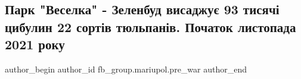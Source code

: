  
 
 
 
 

\subsection{Парк "Веселка" - Зеленбуд висаджує 93 тисячі цибулин 22 сортів тюльпанів. Початок листопада 2021 року}
\label{sec:19_02_2023.fb.fb_group.mariupol.pre_war.1.park__veselka____zel}

\ifcmt
 author_begin
   author_id fb_group.mariupol.pre_war
 author_end
\fi

